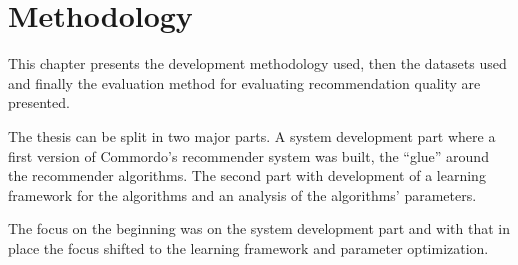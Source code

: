 \chapter{Methodology}\label{cha:method}


This chapter presents the development methodology used, then the datasets used and finally the evaluation method for evaluating recommendation quality are presented.

The thesis can be split in two major parts. A system development part where a first version of Commordo's recommender system was built, the ``glue'' around the recommender algorithms. The second part with development of a learning framework for the algorithms and an analysis of the algorithms' parameters.

The focus on the beginning was on the system development part and with that in place the focus shifted to the learning framework and parameter optimization.





